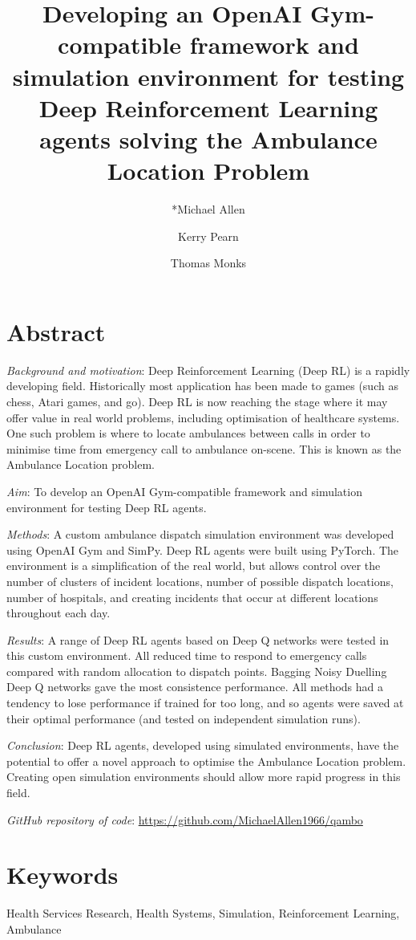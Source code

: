 \documentclass{article}
\title{Developing an OpenAI Gym-compatible framework and simulation environment for testing Deep Reinforcement Learning agents solving the Ambulance Location Problem\\}
\author[1]{*Michael Allen}
\author[1]{Kerry Pearn}
\author[2]{Thomas Monks}
\affil[1,*]{\footnotesize University of Exeter Medical School \& NIHR South West Peninsula Applied Research Collaboration (ARC).}
\affil[2]{\footnotesize University of Exeter Institute of Data Science and Artificial Intelligence}
\affil[*]{\footnotesize Corresponding author: m.allen@exeter.ac.uk}
\begin{document}
\maketitle

\section*{Abstract} 

\emph{Background and motivation}: Deep Reinforcement Learning  (Deep RL) is a rapidly developing field. Historically most application has been made to games (such as chess, Atari games, and go). Deep RL is now reaching the stage where it may offer value in real world problems, including optimisation of healthcare systems. One such problem is where to locate ambulances between calls in order to minimise time from emergency call to ambulance on-scene. This is known as the Ambulance Location problem.

\emph{Aim}: To develop an OpenAI Gym-compatible framework and simulation environment for testing Deep RL agents.

\emph{Methods}: A custom ambulance dispatch simulation environment was developed using OpenAI Gym and SimPy. Deep RL agents were built using PyTorch. The environment is a simplification of the real world, but allows control over the number of clusters of incident locations, number of possible dispatch locations, number of hospitals, and creating incidents that occur at different locations throughout each day.

\emph{Results}: A range of Deep RL agents based on Deep Q networks were tested in this custom environment. All reduced time to respond to emergency calls compared with random allocation to dispatch points. Bagging Noisy Duelling Deep Q networks gave the most consistence performance. All methods had a tendency to lose performance if trained for too long, and so agents were saved at their optimal performance (and tested on independent simulation runs).

\emph{Conclusion}: Deep RL agents, developed using simulated environments, have the potential to offer a novel approach to optimise the Ambulance Location problem. Creating open simulation environments should allow more rapid progress in this field.

\emph{GitHub repository of code}: \url{https://github.com/MichaelAllen1966/qambo}

\section*{Keywords}
Health Services Research, Health Systems, Simulation, Reinforcement Learning, Ambulance
\end{document}
